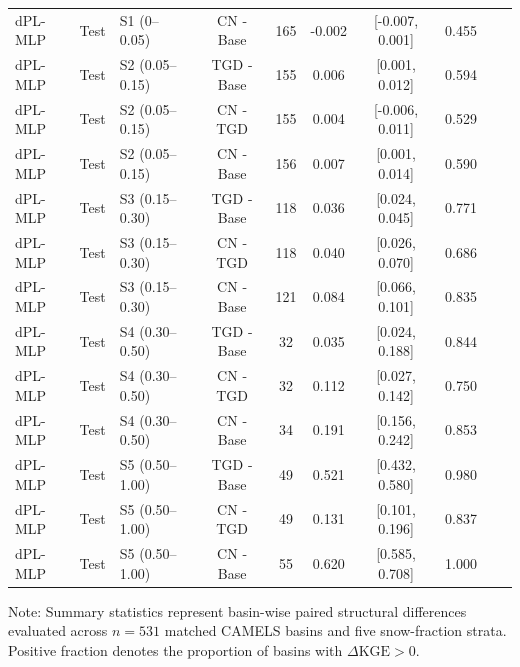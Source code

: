 \begin{table}[t]
\begin{threeparttable}
\begin{tabular}{lllccccccc}
dPL-MLP & Test & S1 (0–0.05) & CN - Base & 165 & -0.002 & [-0.007, 0.001] & 0.455 \\
dPL-MLP & Test & S2 (0.05–0.15) & TGD - Base & 155 & 0.006 & [0.001, 0.012] & 0.594 \\
dPL-MLP & Test & S2 (0.05–0.15) & CN - TGD & 155 & 0.004 & [-0.006, 0.011] & 0.529 \\
dPL-MLP & Test & S2 (0.05–0.15) & CN - Base & 156 & 0.007 & [0.001, 0.014] & 0.590 \\
dPL-MLP & Test & S3 (0.15–0.30) & TGD - Base & 118 & 0.036 & [0.024, 0.045] & 0.771 \\
dPL-MLP & Test & S3 (0.15–0.30) & CN - TGD & 118 & 0.040 & [0.026, 0.070] & 0.686 \\
dPL-MLP & Test & S3 (0.15–0.30) & CN - Base & 121 & 0.084 & [0.066, 0.101] & 0.835 \\
dPL-MLP & Test & S4 (0.30–0.50) & TGD - Base & 32 & 0.035 & [0.024, 0.188] & 0.844 \\
dPL-MLP & Test & S4 (0.30–0.50) & CN - TGD & 32 & 0.112 & [0.027, 0.142] & 0.750 \\
dPL-MLP & Test & S4 (0.30–0.50) & CN - Base & 34 & 0.191 & [0.156, 0.242] & 0.853 \\
dPL-MLP & Test & S5 (0.50–1.00) & TGD - Base & 49 & 0.521 & [0.432, 0.580] & 0.980 \\
dPL-MLP & Test & S5 (0.50–1.00) & CN - TGD & 49 & 0.131 & [0.101, 0.196] & 0.837 \\
dPL-MLP & Test & S5 (0.50–1.00) & CN - Base & 55 & 0.620 & [0.585, 0.708] & 1.000 \\
\bottomrule
\end{tabular}
\begin{tablenotes}
\small
\item Note: Summary statistics represent basin-wise paired structural differences evaluated across $n = 531$ matched CAMELS basins and five snow-fraction strata. Positive fraction denotes the proportion of basins with $\Delta\text{KGE} > 0$.
\end{tablenotes}
\end{threeparttable}
\end{table}
